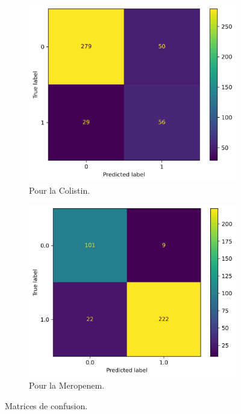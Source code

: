 \documentclass[11pt]{article}
\begin{document}
  \begin{figure}[H]
    \centering
    \begin{subfigure}[b]{0.49\textwidth}
      \centering
      \includegraphics[width=\textwidth]{conf_mat_colis}
      \caption{Pour la Colistin.}
      \label{fig:conf_mat_colis}
    \end{subfigure}
    \hfill
    \begin{subfigure}[b]{0.49\textwidth}
      \centering
      \includegraphics[width=\textwidth]{conf_mat_merop}
      \caption{Pour la Meropenem.}
      \label{fig:conf_mat_merop}
    \end{subfigure}
    \hfill
    \caption{Matrices de confusion.}
    \label{fig:conf_mat}
  \end{figure}
\end{document}
